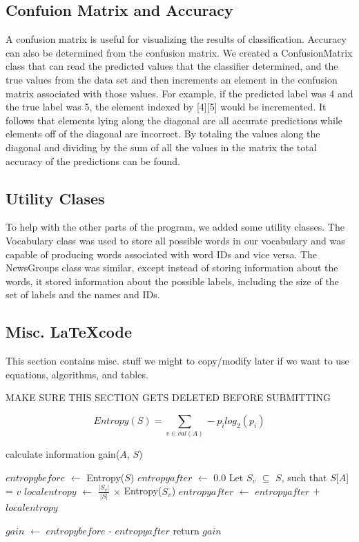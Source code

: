 \documentclass{IEEEtran}
\begin{document}
\subsection{Confuion Matrix and Accuracy}
A confusion matrix is useful for visualizing the results of classification. Accuracy can also be determined from the confusion matrix. We created a ConfusionMatrix class that can read the predicted values that the classifier determined, and the true values from the data set and then increments an element in the confusion matrix associated with those values. For example, if the predicted label was 4 and the true label was 5, the element indexed by [4][5] would be incremented. It follows that elements lying along the diagonal are all accurate predictions while elements off of the diagonal are incorrect. By totaling the values along the diagonal and dividing by the sum of all the values in the matrix the total accuracy of the predictions can be found. 

\subsection{Utility Clases}
To help with the other parts of the program, we added some utility classes. The Vocabulary class was used to store all possible words in our vocabulary and was capable of producing words associated with word IDs and vice versa. The NewsGroups class was similar, except instead of storing information about the words, it stored information about the possible labels, including the size of the set of labels and the names and IDs.

\subsection{Misc. \LaTeX code}
This section contains misc. stuff we might to copy/modify later if we want to use equations, algorithms, and tables.

MAKE SURE THIS SECTION GETS DELETED BEFORE SUBMITTING

\begin{equation}
\label{entropy-equation}
Entropy(S) = \sum_{v\in val(A)}-p_ilog_2(p_i)
\end{equation}


\begin{algorithm}
\caption{calculate information gain($A$, $S$)}
\begin{algorithmic}
\Statex{}
\State $entropybefore$ $\leftarrow$ Entropy($S$)
\State $entropyafter$ $\leftarrow$ 0.0
  \State Let $S_v$ $\subseteq$ $S$, such that $S$[$A$] = $v$
  \State $localentropy$ $\leftarrow$ $\frac{|S_v|}{|S|}$ $\times$ Entropy($S_v$)
  \State $entropyafter$ $\leftarrow$ $entropyafter$ + $localentropy$
\EndFor

\State $gain$ $\leftarrow$ $entropybefore$ - $entropyafter$
\State return $gain$
\end{algorithmic}
\end{algorithm}
\end{document}

